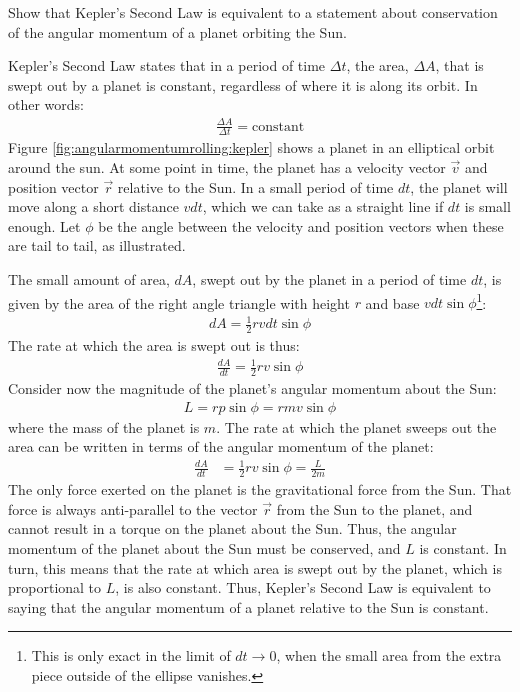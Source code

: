 \begin{example}{Show that Kepler's Second Law is equivalent to a statement about conservation of the angular momentum of a planet orbiting the Sun.}

Kepler's Second Law states that in a period of time $\Delta t$, the area, $\Delta A$, that is swept out by a planet is constant, regardless of where it is along its orbit. In other words:
\begin{align*}
\frac{\Delta A}{\Delta t} = \text{constant}
\end{align*}
 Figure \ref{fig:angularmomentumrolling:kepler} shows a planet in an elliptical orbit around the sun. 
At some point in time, the planet has a velocity vector $\vec v$ and position vector $\vec r$ relative to the Sun. In a small period of time $dt$, the planet will move along a short distance $vdt$, which we can take as a straight line if $dt$ is small enough. Let $\phi$ be the angle between the velocity and position vectors when these are tail to tail, as illustrated. 

The small amount of area, $dA$, swept out by the planet in a period of time $dt$, is given by the area of the right angle triangle with height $r$ and base $vdt\sin\phi$\footnote{This is only exact in the limit of $dt\to 0$, when the small area from the extra piece outside of the ellipse vanishes.}:
\begin{align*}
dA = \frac{1}{2} r vdt\sin\phi
\end{align*}
The rate at which the area is swept out is thus:
\begin{align*}
\frac{dA}{dt} =  \frac{1}{2} r v\sin\phi
\end{align*}
Consider now the magnitude of the planet's angular momentum about the Sun:
\begin{align*}
L = rp\sin\phi = rmv\sin\phi
\end{align*}
where the mass of the planet is $m$. The rate at which the planet sweeps out the area can be written in terms of the angular momentum of the planet:
\begin{align*}
\frac{dA}{dt} &=  \frac{1}{2} r v\sin\phi = \frac{L}{2m}
\end{align*}
The only force exerted on the planet is the gravitational force from the Sun. That force is always anti-parallel to the vector $\vec r$ from the Sun to the planet, and cannot result in a torque on the planet about the Sun. Thus, the angular momentum of the planet about the Sun must be conserved, and $L$ is constant. In turn, this means that the rate at which area is swept out by the planet, which is proportional to $L$, is also constant. Thus, Kepler's Second Law is equivalent to saying that the angular momentum of a planet relative to the Sun is constant. 
\end{example}

